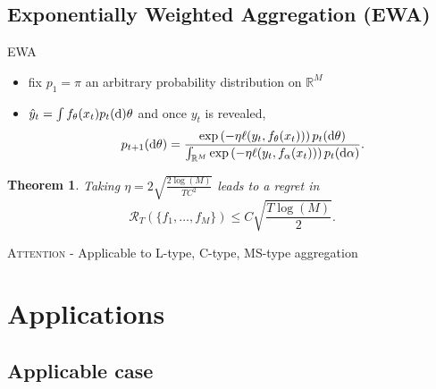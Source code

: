 \documentclass{beamer}
\newtheorem{Th}{Theorem}
\begin{document}
		\subsection{Exponentially Weighted Aggregation (EWA)}
			\begin{frame}{EWA}

				  
				\begin{itemize}
				\item fix $p_1 = \pi$ an arbitrary probability distribution on $\mathbb{R}^M$ 
				\item $\hat{y}_t=\int f_\theta (x_t) p_t({\rm d})\theta$ and once $y_t$ is revealed,
$$ p_{t+1}({\rm d}\theta) = \frac{
\exp\left(-\eta \ell(y_t,f_\theta (x_t)) \right) p_{t}({\rm d}\theta)
}{
\int_{\mathbb{R}^M} \exp\left(-\eta \ell(y_t,f_\alpha (x_t)) \right) p_{t}({\rm d}\alpha)
}. $$
				\end{itemize}
				\begin{Th}
					Taking $\eta=2\sqrt{\frac{2\log(M)}{T C^2}}$ leads to a regret in
$$
\mathcal{R}_T(\{f_1,\dots,f_M\}) \leq C \sqrt{\frac{T \log(M)}{2}}.
$$
				\end{Th}
				\textsc{Attention} - Applicable to L-type, C-type, MS-type aggregation
			\end{frame}


\section{Applications}
		\subsection{Applicable case}
\end{document}
